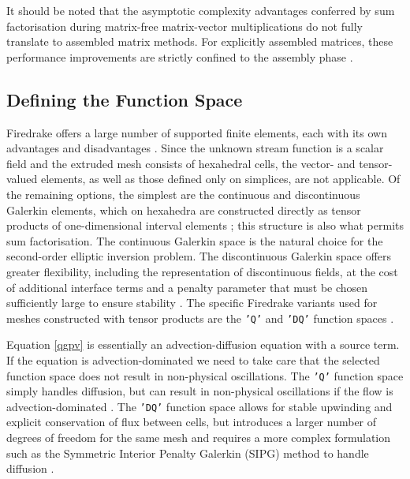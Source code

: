 \documentclass{article}
\begin{document}
It should be noted that the asymptotic complexity advantages conferred by sum factorisation during matrix-free matrix-vector multiplications do not fully translate to assembled matrix methods.
For explicitly assembled matrices, these performance improvements are strictly confined to the assembly phase \cite{Homolya2017, KirbyMitchell2018}.

\subsection{Defining the Function Space}\label{sec:cg_space}

Firedrake offers a large number of supported finite elements, each with its own advantages and disadvantages \cite{FiredrakeUserManual}.
Since the unknown stream function is a scalar field and the extruded mesh consists of hexahedral cells, the vector- and tensor-valued elements, as well as those defined only on simplices, are not applicable.
Of the remaining options, the simplest are the continuous and discontinuous Galerkin elements, which on hexahedra are constructed directly as tensor products of one-dimensional interval elements \cite{Homolya2017}; this structure is also what permits sum factorisation.
The continuous Galerkin space is the natural choice for the second-order elliptic inversion problem.
The discontinuous Galerkin space offers greater flexibility, including the representation of discontinuous fields, at the cost of additional interface terms and a penalty parameter that must be chosen sufficiently large to ensure stability \cite{larson2013finite}.
The specific Firedrake variants used for meshes constructed with tensor products are the \texttt{'Q'} and \texttt{'DQ'} function spaces \cite{FiredrakeUserManual}.

Equation \eqref{qgpv} is essentially an advection-diffusion equation with a source term.
If the equation is advection-dominated we need to take care that the selected function space does not result in non-physical oscillations.
The \texttt{'Q'} function space simply handles diffusion, but can result in non-physical oscillations if the flow is advection-dominated \cite{Durran2010}.
The \texttt{'DQ'} function space allows for stable upwinding and explicit conservation of flux between cells, but introduces a larger number of degrees of freedom for the same mesh and requires a more complex formulation such as the Symmetric Interior Penalty Galerkin (SIPG) method to handle diffusion \cite{FiredrakeUserManual}.
\end{document}

